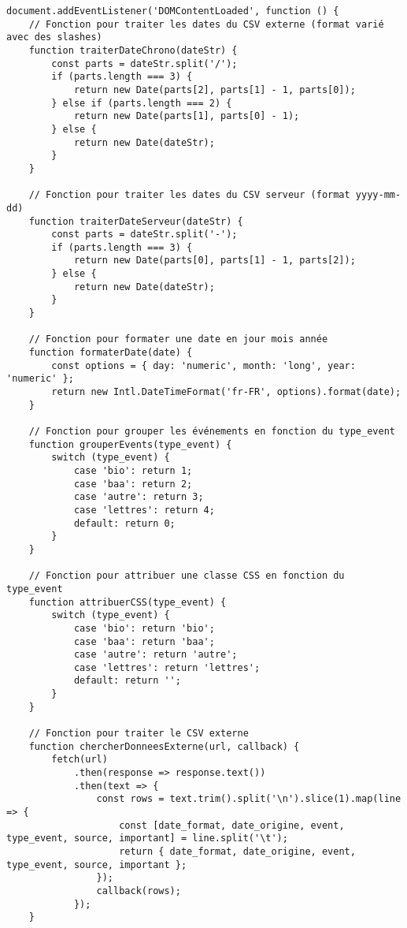 \begin{verbatim}
document.addEventListener('DOMContentLoaded', function () {
    // Fonction pour traiter les dates du CSV externe (format varié avec des slashes)
    function traiterDateChrono(dateStr) {
        const parts = dateStr.split('/');
        if (parts.length === 3) {
            return new Date(parts[2], parts[1] - 1, parts[0]);
        } else if (parts.length === 2) {
            return new Date(parts[1], parts[0] - 1);
        } else {
            return new Date(dateStr); 
        }
    }

    // Fonction pour traiter les dates du CSV serveur (format yyyy-mm-dd)
    function traiterDateServeur(dateStr) {
        const parts = dateStr.split('-');
        if (parts.length === 3) {
            return new Date(parts[0], parts[1] - 1, parts[2]);
        } else {
            return new Date(dateStr); 
        }
    }

    // Fonction pour formater une date en jour mois année
    function formaterDate(date) {
        const options = { day: 'numeric', month: 'long', year: 'numeric' };
        return new Intl.DateTimeFormat('fr-FR', options).format(date);
    }

    // Fonction pour grouper les événements en fonction du type_event
    function grouperEvents(type_event) {
        switch (type_event) {
            case 'bio': return 1;
            case 'baa': return 2;
            case 'autre': return 3;
            case 'lettres': return 4;
            default: return 0;
        }
    }

    // Fonction pour attribuer une classe CSS en fonction du type_event
    function attribuerCSS(type_event) {
        switch (type_event) {
            case 'bio': return 'bio';
            case 'baa': return 'baa';
            case 'autre': return 'autre';
            case 'lettres': return 'lettres';
            default: return '';
        }
    }

    // Fonction pour traiter le CSV externe
    function chercherDonneesExterne(url, callback) {
        fetch(url)
            .then(response => response.text())
            .then(text => {
                const rows = text.trim().split('\n').slice(1).map(line => {
                    const [date_format, date_origine, event, type_event, source, important] = line.split('\t');
                    return { date_format, date_origine, event, type_event, source, important };
                });
                callback(rows);
            });
    }


\end{verbatim}
